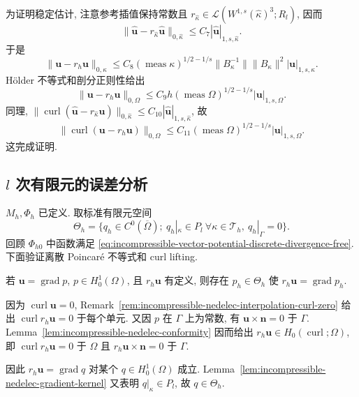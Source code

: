 \begin{Proof}
为证明稳定估计, 注意参考插值保持常数且
$r_{\widehat\kappa}\in
\mathcal L(W^{1,s}(\widehat\kappa)^3;R_l)$, 因而
\[
\|\widehat{\mathbf u}-r_{\widehat\kappa}
\widehat{\mathbf u}\|_{0,\widehat\kappa}
\leq C_7|\widehat{\mathbf u}|_{1,s,\widehat\kappa}.
\]
于是
\[
\|\mathbf u-r_h\mathbf u\|_{0,\kappa}
\leq C_8(\operatorname{meas}\kappa)^{1/2-1/s}
\|B_\kappa^{-1}\|\|B_\kappa\|^2|\mathbf u|_{1,s,\kappa}.
\]
Hölder 不等式和剖分正则性给出
\[
\|\mathbf u-r_h\mathbf u\|_{0,\Omega}
\leq C_9h(\operatorname{meas}\Omega)^{1/2-1/s}
|\mathbf u|_{1,s,\Omega}.
\]
同理,
$\|\operatorname{curl}(\widehat{\mathbf u}
-r_{\widehat\kappa}\widehat{\mathbf u})\|_{0,\widehat\kappa}
\leq C_{10}|\widehat{\mathbf u}|_{1,s,\widehat\kappa}$,
故
\[
\|\operatorname{curl}(\mathbf u-r_h\mathbf u)\|_{0,\Omega}
\leq C_{11}(\operatorname{meas}\Omega)^{1/2-1/s}
|\mathbf u|_{1,s,\Omega}.
\]
这完成证明.
\end{Proof}

\subsection{$l$ 次有限元的误差分析}
\label{subsec:incompressible-vector-potential-error-analysis}

$M_h,\Phi_h$ 已定义. 取标准有限元空间
\begin{equation}\label{eq:incompressible-vector-potential-scalar-space}
\Theta_h=\{q_h\in C^0(\overline\Omega);
\ q_h|_\kappa\in P_l\ \forall\kappa\in\mathcal T_h,
\ q_h|_\Gamma=0\}.
\end{equation}
回顾 $\Phi_{h0}$ 中函数满足
\eqref{eq:incompressible-vector-potential-discrete-divergence-free}.
下面验证离散 Poincaré 不等式和 curl lifting.

\begin{Lemma}\label{lem:incompressible-nedelec-gradient-interpolation}
若 $\mathbf u=\operatorname{grad}p$, $p\in H_0^1(\Omega)$,
且 $r_h\mathbf u$ 有定义, 则存在 $p_h\in\Theta_h$ 使
$r_h\mathbf u=\operatorname{grad}p_h$.
\end{Lemma}

\begin{Proof}
因为 $\operatorname{curl}\mathbf u=0$,
Remark~\ref{rem:incompressible-nedelec-interpolation-curl-zero}
给出 $\operatorname{curl}r_h\mathbf u=0$ 于每个单元.
又因 $p$ 在 $\Gamma$ 上为常数, 有
$\mathbf u\times\mathbf n=0$ 于 $\Gamma$.
Lemma~\ref{lem:incompressible-nedelec-conformity} 因而给出
$r_h\mathbf u\in H_0(\operatorname{curl};\Omega)$, 即
$\operatorname{curl}r_h\mathbf u=0$ 于 $\Omega$ 且
$r_h\mathbf u\times\mathbf n=0$ 于 $\Gamma$.

因此 $r_h\mathbf u=\operatorname{grad}q$
对某个 $q\in H_0^1(\Omega)$ 成立.
Lemma~\ref{lem:incompressible-nedelec-gradient-kernel}
又表明 $q|_\kappa\in P_l$, 故 $q\in\Theta_h$.
\end{Proof}

